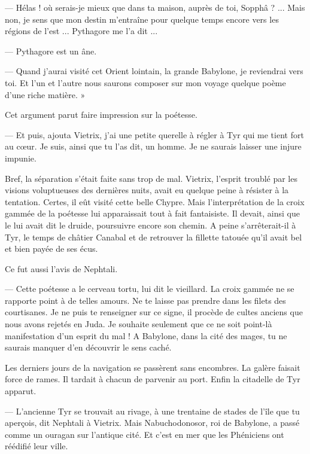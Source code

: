 \documentclass[a4paper, 11pt, oneside, polutonikogreek, french]{article}
\begin{document}
--- Hélas ! où serais-je mieux que dans ta maison, auprès de toi, Sopphâ ? ... Mais non, je sens que mon destin m'entraîne pour quelque temps encore vers les régions de l'est ... Pythagore me l'a dit ...

--- Pythagore est un âne.

--- Quand j'aurai visité cet Orient lointain, la grande Babylone, je reviendrai vers toi. Et l'un et l'autre nous saurons composer sur mon voyage quelque poème d'une riche matière. »

Cet argument parut faire impression sur la poétesse.

--- Et puis, ajouta Vietrix, j'ai une petite querelle à régler à Tyr qui me tient fort au cœur. Je suis, ainsi que tu l'as dit, un homme. Je ne saurais laisser une injure impunie.

\bigskip
\centerline{\EightStarTaper}
\centerline{\EightStarTaper\EightStarTaper}
\bigskip

Bref, la séparation s'était faite sans trop de mal. Vietrix, l'esprit troublé par les visions voluptueuses des dernières nuits, avait eu quelque peine à résister à la tentation. Certes, il eût visité cette belle Chypre. Mais l'interprétation de la croix gammée de la poétesse lui apparaissait tout à fait fantaisiste. Il devait, ainsi que le lui avait dit le druide, poursuivre encore son chemin. A peine s'arrêterait-il à Tyr, le temps de châtier Canabal et de retrouver la fillette tatouée qu'il avait bel et bien payée de ses écus.

Ce fut aussi l'avis de Nephtali.

--- Cette poétesse a le cerveau tortu, lui dit le vieillard. La croix gammée ne se rapporte point à de telles amours. Ne te laisse pas prendre dans les filets des courtisanes. Je ne puis te renseigner sur ce signe, il procède de cultes anciens que nous avons rejetés en Juda. Je souhaite seulement que ce ne soit point-là manifestation d'un esprit du mal ! A Babylone, dans la cité des mages, tu ne saurais manquer d'en découvrir le sens caché.

\bigskip
\centerline{\EightStarTaper}
\centerline{\EightStarTaper\EightStarTaper}
\bigskip

Les derniers jours de la navigation se passèrent sans encombres. La galère faisait force de rames. Il tardait à chacun de parvenir au port. Enfin la citadelle de Tyr apparut.

--- L'ancienne Tyr se trouvait au rivage, à une trentaine de stades de l'île que tu aperçois, dit Nephtali à Vietrix. Mais Nabuchodonosor, roi de Babylone, a passé comme un ouragan sur l'antique cité. Et c'est en mer que les Phéniciens ont réédifié leur ville.
\end{document}
